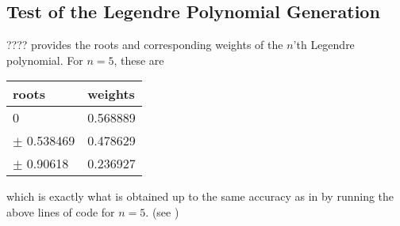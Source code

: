 \subsection{Test of the Legendre Polynomial Generation}
???? provides the roots and corresponding weights of the $n$'th Legendre polynomial.
For $n=5$, these are 
\begin{table}[H]
\centering
\begin{tabular}{ | l | l | }
  \hline			
  roots & weights  \\
  \hline
  0 & 0.568889  \\
  \hline
  $\pm$ 0.538469 & 0.478629  \\
  \hline 
  $\pm$ 0.90618 & 0.236927 \\
  \hline 
\end{tabular}
\label{tab:testGLdpol}
\end{table}
which is exactly what is obtained up to the same accuracy as in  by running the above lines of code for $n=5$. (see )